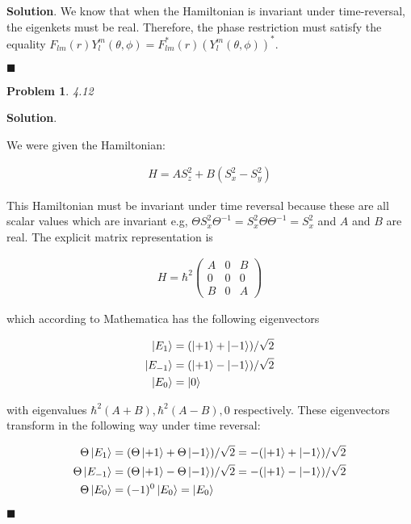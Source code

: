 \documentclass[12pt]{article}
\newtheorem{p}{Problem}
\theoremstyle{definition}
\newenvironment{s}{%
        \begin{trivlist} \item \textbf{Solution}. }{%
            \hspace*{\fill} $\blacksquare$\end{trivlist}}%
\begin{document}
{\begin{s}
We know that when the Hamiltonian is invariant under time-reversal, the eigenkets must be real. Therefore, the phase restriction must satisfy the equality $F_{lm}(r)Y_{l}^{m}(\theta,\phi) = F_{lm}^{*}(r)(Y_{l}^{m}(\theta,\phi))^{*}$.

\end{s}

\begin{p}
4.12
\end{p}

\begin{s}

We were given the Hamiltonian:

\begin{align*}
H = AS_{z}^{2} + B(S_{x}^{2} - S_{y}^{2})
\end{align*}

This Hamiltonian must be invariant under time reversal because these are all scalar values which are invariant e.g, $\Theta S_{x}^{2}\Theta^{-1} = S_{x}^{2}\Theta\Theta^{-1} = S_{x}^{2}$ and $A$ and $B$ are real. The explicit matrix representation is

\begin{align*}
H = \hbar^{2}\begin{pmatrix}A&0&B\\0&0&0\\B&0&A\end{pmatrix}
\end{align*}

which according to Mathematica has the following eigenvectors


\begin{align*}
\ket{E_{1}} &= (\ket{+1}+\ket{-1})/\sqrt{2}\\
\ket{E_{-1}} &= (\ket{+1}-\ket{-1})/\sqrt{2}\\
\ket{E_{0}} &= \ket{0}\\
\end{align*}

with eigenvalues $\hbar^{2}(A+B), \hbar^{2}(A-B), 0$ respectively. These eigenvectors transform in the following way under time reversal:

\begin{align*}
\Theta\ket{E_{1}} &= (\Theta\ket{+1}+\Theta\ket{-1})/\sqrt{2} = -(\ket{+1}+\ket{-1})/\sqrt{2}\\
\Theta\ket{E_{-1}} &= (\Theta\ket{+1}-\Theta\ket{-1})/\sqrt{2} = -(\ket{+1}-\ket{-1})/\sqrt{2}\\
\Theta\ket{E_{0}} &= (-1)^{0}\ket{E_{0}} = \ket{E_{0}}\\
\end{align*}


\end{s}
\end{document}

